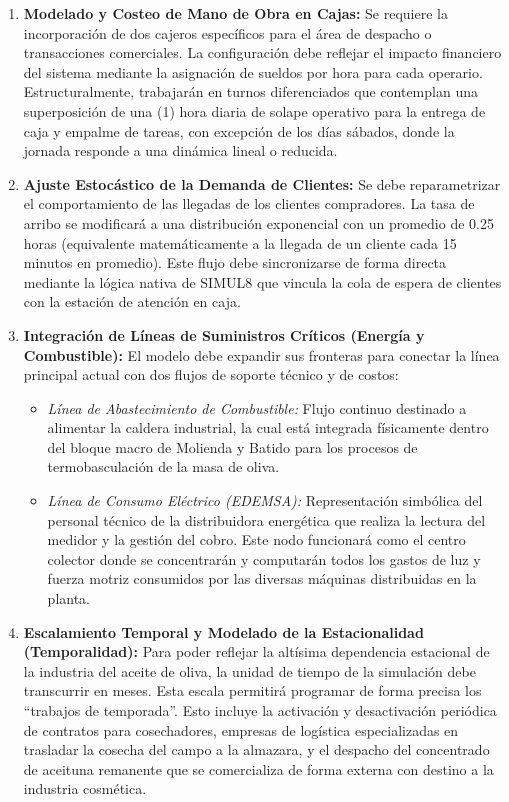 \documentclass[runningheads]{llncs}
\begin{document}
 \begin{enumerate}
    \item \textbf{Modelado y Costeo de Mano de Obra en Cajas:} Se requiere la incorporación de dos cajeros específicos para el área de despacho o transacciones comerciales. La configuración debe reflejar el impacto financiero del sistema mediante la asignación de sueldos por hora para cada operario. Estructuralmente, trabajarán en turnos diferenciados que contemplan una superposición de una (1) hora diaria de solape operativo para la entrega de caja y empalme de tareas, con excepción de los días sábados, donde la jornada responde a una dinámica lineal o reducida.
    
    \item \textbf{Ajuste Estocástico de la Demanda de Clientes:} Se debe reparametrizar el comportamiento de las llegadas de los clientes compradores. La tasa de arribo se modificará a una distribución exponencial con un promedio de 0.25 horas (equivalente matemáticamente a la llegada de un cliente cada 15 minutos en promedio). Este flujo debe sincronizarse de forma directa mediante la lógica nativa de SIMUL8 que vincula la cola de espera de clientes con la estación de atención en caja.
    
    \item \textbf{Integración de Líneas de Suministros Críticos (Energía y Combustible):} El modelo debe expandir sus fronteras para conectar la línea principal actual con dos flujos de soporte técnico y de costos:
    \begin{itemize}
        \item \textit{Línea de Abastecimiento de Combustible:} Flujo continuo destinado a alimentar la caldera industrial, la cual está integrada físicamente dentro del bloque macro de Molienda y Batido para los procesos de termobasculación de la masa de oliva.
        \item \textit{Línea de Consumo Eléctrico (EDEMSA):} Representación simbólica del personal técnico de la distribuidora energética que realiza la lectura del medidor y la gestión del cobro. Este nodo funcionará como el centro colector donde se concentrarán y computarán todos los gastos de luz y fuerza motriz consumidos por las diversas máquinas distribuidas en la planta.
    \end{itemize}
    
    \item \textbf{Escalamiento Temporal y Modelado de la Estacionalidad (Temporalidad):} Para poder reflejar la altísima dependencia estacional de la industria del aceite de oliva, la unidad de tiempo de la simulación debe transcurrir en meses. Esta escala permitirá programar de forma precisa los ``trabajos de temporada''. Esto incluye la activación y desactivación periódica de contratos para cosechadores, empresas de logística especializadas en trasladar la cosecha del campo a la almazara, y el despacho del concentrado de aceituna remanente que se comercializa de forma externa con destino a la industria cosmética.
    

\end{enumerate}
\end{document}

